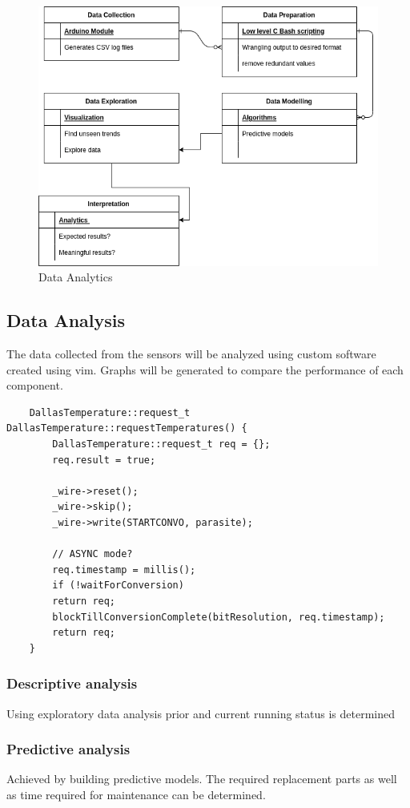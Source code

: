 \begin{figure}[hb]
	\centering
	\includegraphics[width=0.7\linewidth]{Figures/data_analytics_process-steps}
	\caption{Data Analytics}
	\label{fig:dataanalyticsprocess-steps}
\end{figure}


\subsection{ Data Analysis}
The data collected from the sensors will be analyzed using custom software created using vim. Graphs will be generated to compare the performance of each component.

\begin{lstlisting}
	DallasTemperature::request_t DallasTemperature::requestTemperatures() {
		DallasTemperature::request_t req = {};
		req.result = true;
		
		_wire->reset();
		_wire->skip();
		_wire->write(STARTCONVO, parasite);
		
		// ASYNC mode?
		req.timestamp = millis();
		if (!waitForConversion)
		return req;
		blockTillConversionComplete(bitResolution, req.timestamp);
		return req;
	}
\end{lstlisting}


	\subsubsection{Descriptive analysis}
	Using exploratory data analysis prior and current running status is determined 
	
	\subsubsection{Predictive analysis}
	Achieved by building predictive models. The required replacement parts as well as time required for maintenance can be determined.
	
